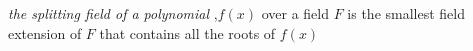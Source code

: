 \documentclass[preview]{standalone}
\begin{document}
\begin{center}
\textit{the splitting field of a polynomial },$f(x)$ over a field $F$ is the smallest field extension of $F$ that contains all the roots of $f(x)$
\end{center}
\end{document}
